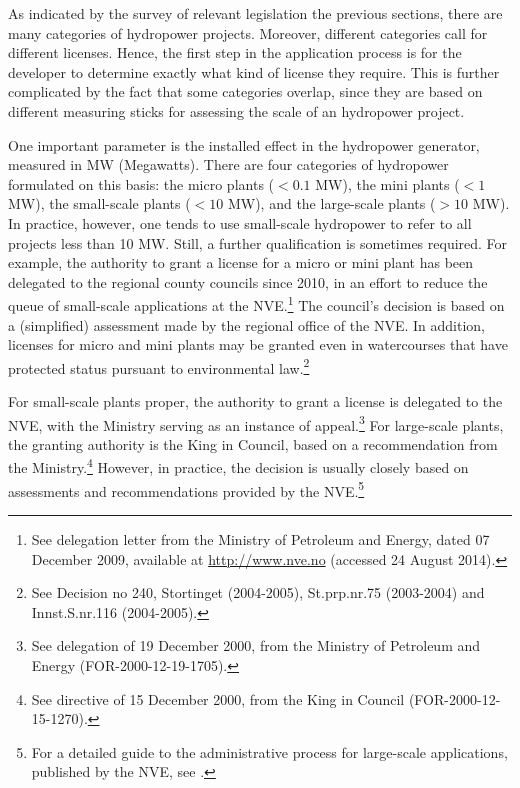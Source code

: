 
As indicated by the survey of relevant legislation the previous sections, there are many categories of hydropower projects. Moreover, different categories call for different licenses. Hence, the first step in the application process is for the developer to determine exactly what kind of license they require. This is further complicated by the fact that some categories overlap, since they are based on different measuring sticks for assessing the scale of an hydropower project. 

One important parameter is the installed effect in the hydropower generator, measured in MW (Megawatts). There are four categories of hydropower formulated on this basis: the micro plants ($< 0.1$ MW), the mini plants ($< 1$ MW), the small-scale plants ($< 10$ MW), and the large-scale plants ($> 10$ MW). In practice, however, one tends to use small-scale hydropower to refer to all projects less than 10 MW. Still, a further qualification is sometimes required. For example, the authority to grant a license for a micro or mini plant has been delegated to the regional county councils since 2010, in an effort to reduce the queue of small-scale applications at the NVE.\footnote{See delegation letter from the Ministry of Petroleum and Energy, dated 07 December 2009, available at \url{http://www.nve.no} (accessed 24 August 2014).} The council's decision is based on a (simplified) assessment made by the regional office of the NVE. In addition, licenses for micro and mini plants may be granted even in watercourses that have protected status pursuant to environmental law.\footnote{See Decision no 240, Stortinget (2004-2005), St.prp.nr.75 (2003-2004) and Innst.S.nr.116 (2004-2005).}

For small-scale plants proper, the authority to grant a license is delegated to the NVE, with the Ministry serving as an instance of appeal.\footnote{See delegation of 19 December 2000, from the Ministry of Petroleum and Energy (FOR-2000-12-19-1705).} For large-scale plants, the granting authority is the King in Council, based on a recommendation from the Ministry.\footnote{See directive of 15 December 2000, from the King in Council (FOR-2000-12-15-1270).} However, in practice, the decision is usually closely based on assessments and recommendations provided by the NVE.\footnote{For a detailed guide to the administrative process for large-scale applications, published by the NVE, see \cite{stokker10}.}

